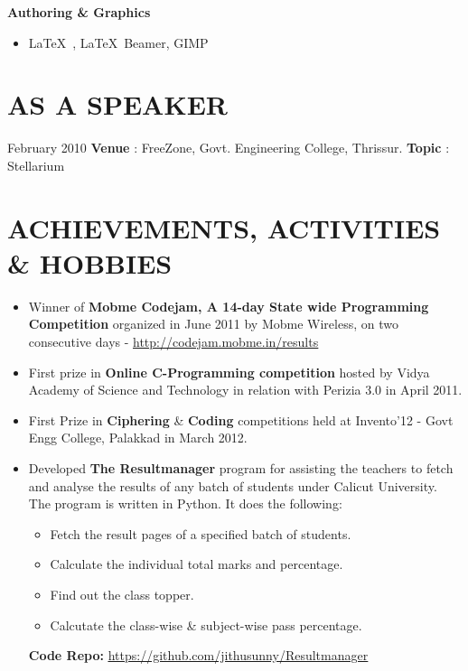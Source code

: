 \begin{resume}
\textbf{Authoring \& Graphics}
\begin{itemize}
\item \LaTeX\ , \LaTeX\ Beamer, GIMP
\end{itemize}


\vspace*{+2mm}

\section{\sc \bf \textsf{AS A SPEAKER}}
February 2010 \textbf{Venue} : FreeZone, Govt. Engineering College, Thrissur. \textbf{Topic} : Stellarium

\vspace*{+2mm}

\section{\sc \bf \textsf{ACHIEVEMENTS, ACTIVITIES \& HOBBIES}}
\begin{itemize}
\item Winner of \textbf{Mobme Codejam, A 14-day State wide Programming Competition} organized in June 2011 by Mobme Wireless, on two consecutive days - \href{http://codejam.mobme.in/results}{\underline{http://codejam.mobme.in/results}}
\item First prize in \textbf{Online C-Programming competition} hosted by Vidya Academy of Science and Technology in relation with Perizia 3.0 in April 2011.
\item First Prize in \textbf{Ciphering} \& \textbf{Coding} competitions held at Invento'12 - Govt Engg College, Palakkad in March 2012.
\item Developed \textbf{The Resultmanager} program for assisting the teachers to fetch and analyse the results of any batch of students under Calicut University. The program is written in Python. It does the following:
\begin{itemize}
\item Fetch the result pages of a specified batch of students. 
\item Calculate the individual total marks and percentage.
\item Find out the class topper.
\item Calcutate the class-wise \& subject-wise pass percentage.
\end{itemize}

\textbf{Code Repo:} \href{https://github.com/jithusunny/Resultmanager}{\underline{https://github.com/jithusunny/Resultmanager}}


\end{itemize}
\end{resume}
